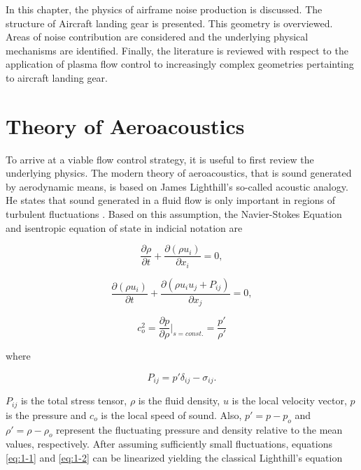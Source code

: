 In this chapter, the physics of airframe noise production is discussed. The structure of Aircraft landing gear is presented. This geometry is overviewed. Areas of noise contribution are considered and the underlying physical mechanisms are identified. Finally, the literature is reviewed with respect to the application of plasma flow control to increasingly complex geometries pertainting to aircraft landing gear.

\section{Theory of Aeroacoustics}
To arrive at a viable flow control strategy, it is useful to first review the underlying physics.
The modern theory of aeroacoustics, that is sound generated by aerodynamic means, is based on James Lighthill's so-called acoustic analogy. He states that sound generated in a fluid flow is only important in regions of turbulent fluctuations \cite{howe2003}. Based on this assumption, the Navier-Stokes Equation and isentropic equation of state in indicial notation are

\begin{equation} \label{eq:1-1}
	\frac{\partial \rho}{\partial t} + \frac{\partial(\rho u_i)}{\partial x_i} = 0,
\end{equation}

\begin{equation} \label{eq:1-2}
\frac{\partial (\rho u_i)}{\partial t} + \frac{\partial(\rho u_i u_j + P_{ij})}{\partial x_j} = 0,
\end{equation}

\begin{equation} \label{eq:1-3}
	c_o^2 = \frac{\partial p}{\partial \rho}|_{s=const.} = \frac{p'}{\rho'}
\end{equation}

where 

\begin{equation} \label{eq:pij}
P_{ij} = p' \delta_{ij} - \sigma_{ij}.
\end{equation}

$P_{ij}$ is the total stress tensor, $\rho$ is the fluid density, $u$ is  the local velocity vector, $p$ is the pressure and $c_o$ is the local speed of sound. Also, $p' = p - p_o$ and $\rho' = \rho - \rho_o$ represent the fluctuating pressure and density relative to the mean values, respectively. After assuming sufficiently small fluctuations, equations \ref{eq:1-1} and \ref{eq:1-2} can be linearized yielding the classical Lighthill's equation

